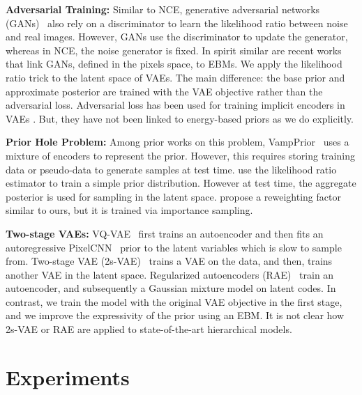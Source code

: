 \documentclass{article} \usepackage{iclr2021_conference,times}
\begin{document}
\textbf{Adversarial Training:} Similar to NCE, generative adversarial networks (GANs)~\citep{goodfellow_generative_2014} also rely on a discriminator to learn the likelihood ratio between noise and real images. However, GANs use the discriminator to update the generator, whereas in NCE, the noise generator is fixed. 
In spirit similar are recent works \citep{azadi2018rejection, turner2019mh-gan, che2020ganSecret} that link GANs, defined in the pixels space, to EBMs. 
We apply the likelihood ratio trick to the latent space of VAEs. The main difference: the base prior and approximate posterior are trained with the VAE objective rather than the adversarial loss. Adversarial loss has been used for training implicit encoders in VAEs \citep{makhzani2015adversarial, mescheder2017adversarial, engel2018latent_adversarial}. But, they have not been linked to energy-based priors as we do explicitly.

\textbf{Prior Hole Problem:} Among prior works on this problem, VampPrior~\citep{tomczak2018VampPrior} uses a mixture of encoders to represent the prior. However, this requires storing training data or pseudo-data to generate samples at test time.  \citet{takahashi2019implicitPrior} use the likelihood ratio estimator to train a simple prior distribution. However at test time, the aggregate posterior is used for sampling in the latent space.  \citet{bauer2019resampledPrior} propose a reweighting factor similar to ours, but it is trained via importance sampling.  

\textbf{Two-stage VAEs:} VQ-VAE~\citep{van2017vqvae, razavi2019generating} first trains an autoencoder and then fits an autoregressive PixelCNN~\citep{van2016pixel} prior to the latent variables which is slow to sample from. Two-stage VAE (2s-VAE)~\citep{dai2018diagnosing} trains a VAE on the data, and then, trains another VAE in the latent space. Regularized autoencoders (RAE)~\citep{ghosh2020deterministicVAE} train an autoencoder, and subsequently a Gaussian mixture model on latent codes. In contrast, we train the model with the original VAE objective in the first stage, and we improve the expressivity of the prior using an EBM. It is not clear how 2s-VAE or RAE are applied to state-of-the-art hierarchical models.
 \vspace{-0.1cm}
\section{Experiments}
\end{document}
